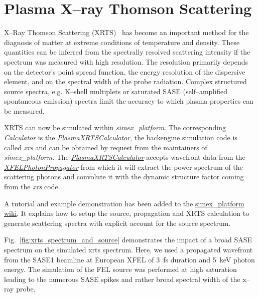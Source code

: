 \documentclass[12pt]{scrartcl}
\begin{document}
\section{Plasma X--ray Thomson Scattering\label{sec:xrts}}
%
X--Ray Thomson Scattering (XRTS)~\cite{Glenzer2009,Fortmann2009d} has
become an important method for the diagnosis of matter at extreme conditions of
temperature and density. These quantities can be inferred from the spectrally
resolved scattering intensity if the spectrum was measured with high resolution.
The resolution primarily depends on the detector's point spread function, the
energy resolution of the dispersive element, and on the spectral width of
the probe radiation. Complex structured source spectra, e.g. K--shell multiplets
\cite{Lee2009} or saturated SASE (self--amplified spontaneous emission) spectra
limit the accuracy to which plasma properties can be measured.

XRTS can now be simulated within \textit{simex\_platform}. The corresponding
\textit{Calculator} is the
\href{https://eucall-software.github.io/simex_platform/#SimEx.Calculators.PlasmaXRTSCalculator.PlasmaXRTSCalculator}{\textit{PlasmaXRTSCalculator}},
the backengine simulation code is called \textit{xrs} and can be obtained by
request from the maintainers of \textit{simex\_platform}. The
\href{https://eucall-software.github.io/simex_platform/#SimEx.Calculators.PlasmaXRTSCalculator.PlasmaXRTSCalculator}{\textit{PlasmaXRTSCalculator}}
accepts wavefront data from the
\href{https://eucall-software.github.io/simex_platform/#SimEx.Calculators.XFELPhotonPropagator.XFELPhotonPropagator}{\textit{XFELPhotonPropagator}}
from which it will extract the power spectrum of the scattering photons and
convolute it with the dynamic structure factor coming from the \textit{xrs}
code.

A tutorial and example demonstration has been added to the
\href{https://github.com/eucall-software/simex_platform/wiki/XRTS-Tutoria}{simex\_platform
wiki}. It explains how to setup the source, propagation and XRTS calculation
to generate scattering spectra with explicit account for the source spectrum.

Fig.~\ref{fig:xrts_spectrum_and_source} demonstrates the impact of a broad SASE
spectrum on the simulated \gls{xrts} spectrum. Here, we used a propagated
wavefront from the SASE1 beamline at European XFEL of \SI{3}{\femto\second}
duration and \SI{5}{\kilo\electronvolt} photon energy. The simulation of the FEL
source was performed at high saturation leading to the numerous SASE spikes and
rather broad spectral width of the x--ray probe.
\end{document}
